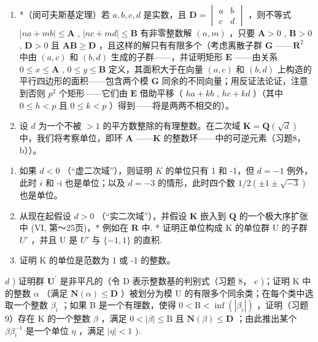 \begin{enumerate}
\def\labelenumi{\arabic{enumi})}
\setcounter{enumi}{8}
\item
  *（闵可夫斯基定理）若 \(a, b, c, d\) 是实数，且 \(\mathbf{D} = \begin{vmatrix} a & b \\ c & d \end{vmatrix}\) ，则不等式 \(|na + mb| \leqslant \mathbf{A}\) , \(|nc + md| \leqslant \mathbf{B}\) 有非零整数解 \((n, m)\) ，只要 \(\mathbf{A} > 0\) , \(\mathbf{B} > 0\) , \(\mathbf{D} > 0\) 且 \(\mathbf{AB} \geqslant \mathbf{D}\) ，且这样的解只有有限多个（考虑离散子群 \(\mathbf{G}\) ——\(\mathbf{R}^2\) 中由 \((a, c)\) 和 \((b, d)\) 生成的子群——，并证明矩形 \(\mathbf{E}\) ——由关系 \(0 \leqslant x \leqslant \mathbf{A}\) , \(0 \leqslant y \leqslant \mathbf{B}\) 定义，其面积大于在向量 \((a, c)\) 和 \((b, d)\) 上构造的平行四边形的面积——包含两个模 \(\mathbf{G}\) 同余的不同向量；用反证法论证，注意到否则 \(p^2\) 个矩形——它们由 \(\mathbf{E}\) 借助平移（ \(ha + kb\) , \(hc + kd\) ）（其中 \(0 \leqslant h < p\) 且 \(0 \leqslant k < p\) ）得到——将是两两不相交的）。
\item
  设 \(d\) 为一个不被 \(>1\) 的平方数整除的有理整数。在二次域 \(\mathbf{K} = \mathbf{Q}(\sqrt{d})\) 中，我们将考察单位，即环 \(\mathbf{A}\) ——\(\mathbf{K}\) 的整数环——中的可逆元素（习题8，b））。
\end{enumerate}

\begin{enumerate}
\def\labelenumi{\alph{enumi})}
\item
  如果 \(d < 0\) （“虚二次域”），则证明 \(K\) 的单位只有 1 和 -1，但 \(d = -1\) 例外，此时 \(i\) 和 -i 也是单位；以及 \(d = -3\) 的情形，此时四个数 \(1/2(\pm 1 \pm \sqrt{-3})\) 也是单位。
\item
  从现在起假设 \(d > 0\) （“实二次域”），并假设 \(\mathbf{K}\) 嵌入到 \(\mathbf{Q}\) 的一个极大序扩张中 (VI, 第～25页)，* 例如在 \(\mathbf{R}\) 中. * 证明正单位构成 K 的单位群 U 的子群 \(U'\) ，并且 U 是 \(U'\) 与 \(\{-1,1\}\) 的直积.
\item
  证明 K 的单位是范数为 1 或 -1 的整数。
\end{enumerate}

\(d\) ) 证明群 \(\mathbf{U}^{\prime}\) 是非平凡的（令 D 表示整数基的判别式（习题 8， \(c\) )；证明 K 中的整数 \(\alpha\) （满足 \(\mathbf{N}(\alpha)\leqslant \mathbf{D}\) ）被划分为模 U 的有限多个同余类；在每个类中选取一个整数 \(\beta_{i}\) ；如果 B 是一个有理数，使得 \(0 < \mathrm{B} < \inf (|\beta_i|)\) ，证明（习题9）存在 K 的一个整数 \(\beta\) ，满足 \(0 < |\beta |\leqslant \mathrm{B}\) 且 \(\mathbf{N}(\beta)\leqslant \mathbf{D}\) ；由此推出某个 \(\beta \beta_{i}^{-1}\) 是一个单位 \(\eta\) ，满足 \(|\eta| < 1\) ).

